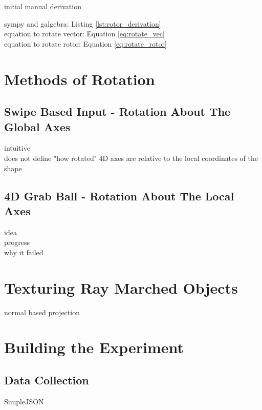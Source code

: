 \documentclass{l4proj}
\begin{document}
\citep{bosch_4d_2011}
\citep{bosch_code_nodate}

initial manual derivation

sympy and galgebra: Listing \ref{lst:rotor_derivation}\\
equation to rotate vector: Equation \ref{eq:rotate_vec}\\
equation to rotate rotor: Equation \ref{eq:rotate_rotor}

\section{Methods of Rotation}

\subsection{Swipe Based Input - Rotation About The Global Axes}

intuitive\\
does not define "how rotated" 4D axes are relative to the local coordinates of the shape

\subsection{4D Grab Ball - Rotation About The Local Axes}

idea\\
progress\\
why it failed

\section{Texturing Ray Marched Objects}

normal based projection

\section{Building the Experiment}

\subsection{}

\subsection{Data Collection}

SimpleJSON \citep{bunny83_simplejson_nodate}
\end{document}
